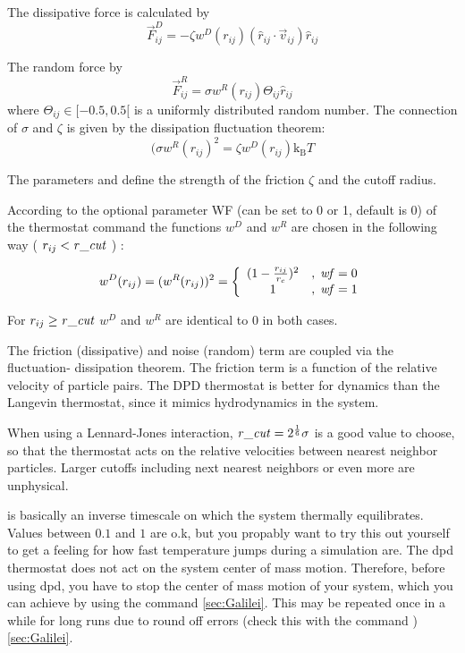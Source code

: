 \noindent The dissipative force is calculated by
\begin{equation}
  \vec{F}_{ij}^{D} = -\zeta w^D (r_{ij}) (\hat{r}_{ij} \cdot \vec{v}_{ij}) \hat{r}_{ij}
\end{equation}

\noindent The random force by
\begin{equation}
  \vec{F}_{ij}^R = \sigma w^R (r_{ij}) \Theta_{ij} \hat{r}_{ij}
\end{equation}
where $ \Theta_{ij} \in [ -0.5 , 0.5 [ $ is a uniformly distributed
random number.  The connection of $\sigma $ and $\zeta $ is given by
the dissipation fluctuation theorem:
\begin{equation}
  (\sigma w^R (r_{ij})^2=\zeta w^D (r_{ij}) \text{k}_\text{B} T
\end{equation}

The parameters  and  define the strength of the
friction $\zeta$ and the cutoff radius.

According to the optional parameter WF (can be set to 0 or 1, default
is 0) of the thermostat command the functions $w^D$ and $w^R$ are
chosen in the following way ( $ r_{ij} < \mathrm{\mathit{r\_cut}} $ ) :

\begin{equation}
w^D (r_{ij}) = ( w^R (r_{ij})) ^2 = 
   \left\{
   \begin{array}{clcr} 
             {( 1 - \frac{r_{ij}}{r_c}} )^2 & , \; \mathrm{\mathit{wf}} = 0 \\
             1                      & , \; \mathrm{\mathit{wf}} = 1
   \end{array}
   \right.
 \end{equation}

 For $ r_{ij} \ge \mathrm{\mathit{r\_cut}} $ $w^D$ and $w^R$ are identical to 0 in
 both cases.

The friction (dissipative) and noise (random) term are coupled via the
fluctuation- dissipation theorem. The friction term is a function of
the relative velocity of particle pairs.  The DPD thermostat is better
for dynamics than the Langevin thermostat, since it mimics
hydrodynamics in the system.

When using a Lennard-Jones interaction, $\mathrm{\mathit{r\_cut}} =
2^{\frac{1}{6}} \sigma$ is a good value to choose, so that the
thermostat acts on the relative velocities between nearest neighbor
particles.  Larger cutoffs including next nearest neighbors or even
more are unphysical.

 is basically an inverse timescale on which the system
thermally equilibrates.  Values between $0.1$ and $1$ are o.k, but you
propably want to try this out yourself to get a feeling for how fast
temperature jumps during a simulation are. The dpd thermostat does not
act on the system center of mass motion.  Therefore, before using dpd,
you have to stop the center of mass motion of your system, which you
can achieve by using the command  
\ref{sec:Galilei}. This may be repeated once in a while for long 
runs due to round off errors (check this with the command 
) \ref{sec:Galilei}.

